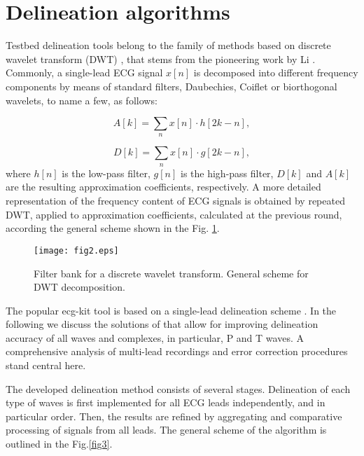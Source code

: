 \documentclass[submitted]{ieeeaccess}
\newcommand{\NewCorrection}[1]{{#1}}
\begin{document}
\section{Delineation algorithms}\label{algorithm}


Testbed delineation tools \cite{ECGKit,Kalyakulina2018} belong to the family of methods based on discrete wavelet transform (DWT) \cite{Martinez2004, Addison2005, DiMarco2011, Bote2017}, that stems from the pioneering work by Li \cite{Li1995}. 
Commonly, a single-lead ECG signal $x[n]$ is decomposed into different frequency components by means of standard filters, Daubechies, Coiflet or biorthogonal wavelets, to name a few, as follows:

\begin{equation}
A\left[k\right] = \sum_{n} x\left[n\right] \cdot h\left[2k-n\right],
\end{equation}	

\begin{equation}
	D\left[k\right] = \sum_{n} x\left[n\right] \cdot g\left[2k-n\right],
\end{equation}	
where $h\left[n\right]$ is the low-pass filter, $g\left[n\right]$ is the high-pass filter, $D\left[k\right]$ and $A\left[k\right]$ are the resulting approximation coefficients, respectively. A more detailed representation of the frequency content of ECG signals is obtained by repeated DWT, applied to approximation coefficients, calculated at the previous round, according the general scheme shown in the Fig. \ref{fig2}.

\begin{figure}
    \centering
	\texttt{[image: fig2.eps]}
	
	\caption{Filter bank for a discrete wavelet transform. General scheme for DWT decomposition.}
	\label{fig2}
\end{figure}

The popular ecg-kit tool \cite{ECGKit} is based on a single-lead delineation scheme \cite{Martinez2004}. In the following we discuss the solutions of \cite{Kalyakulina2018} that allow for improving delineation accuracy of all waves and complexes, in particular, P and T waves. A \NewCorrection{comprehensive} analysis of multi-lead recordings and error correction procedures stand central here.  

The developed delineation method consists of several stages. Delineation of each type of waves is first implemented for all ECG leads independently, and in particular order. Then, the results are refined by aggregating and comparative processing of signals from all leads. The general scheme of the algorithm is outlined in the Fig.\ref{fig3}.
\end{document}

